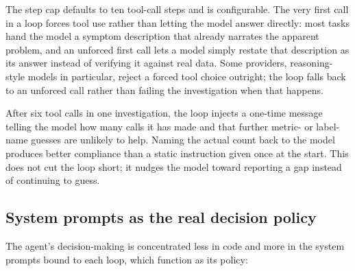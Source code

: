 \documentclass[11pt]{article}
\begin{document}
The step cap defaults to ten tool-call steps and is configurable. The very
first call in a loop forces tool use rather than letting the model answer
directly: most tasks hand the model a symptom description that already
narrates the apparent problem, and an unforced first call lets a model
simply restate that description as its answer instead of verifying it
against real data. Some providers, reasoning-style models in particular,
reject a forced tool choice outright; the loop falls back to an unforced
call rather than failing the investigation when that happens.

After six tool calls in one investigation, the loop injects a one-time
message telling the model how many calls it has made and that further
metric- or label-name guesses are unlikely to help. Naming the actual count
back to the model produces better compliance than a static instruction given
once at the start. This does not cut the loop short; it nudges the model
toward reporting a gap instead of continuing to guess.

\subsection{System prompts as the real decision policy}

The agent's decision-making is concentrated less in code and more in the
system prompts bound to each loop, which function as its policy:
\end{document}
